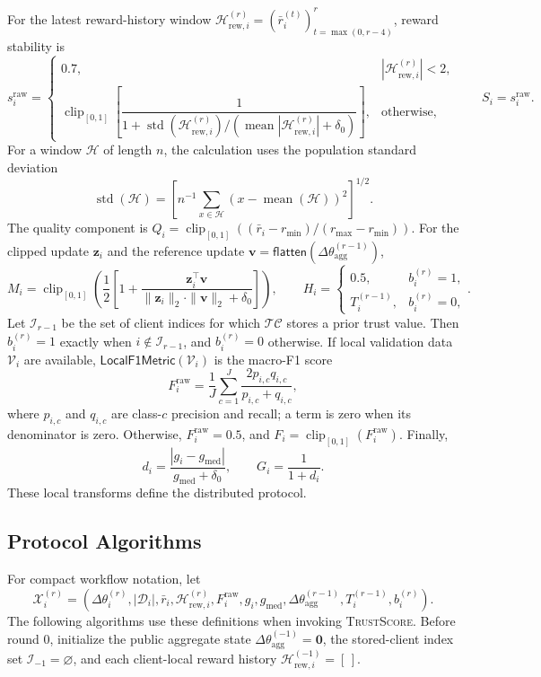 \documentclass{article}
\begin{document}
For the latest reward-history window
$\mathcal H_{\mathrm{rew},i}^{(r)}=
(\bar r_i^{(t)})_{t=\max(0,r-4)}^{r}$, reward stability is
\[
s_i^{\mathrm{raw}}=
\begin{cases}
0.7, & |\mathcal H_{\mathrm{rew},i}^{(r)}|<2,\\
\operatorname{clip}_{[0,1]}
\left[
\dfrac{1}{1+
\operatorname{std}(\mathcal H_{\mathrm{rew},i}^{(r)})/
(\operatorname{mean}|\mathcal H_{\mathrm{rew},i}^{(r)}|+\delta_0)}
\right], & \text{otherwise,}
\end{cases}
\qquad
S_i=s_i^{\mathrm{raw}}.
\]
For a window $\mathcal H$ of length $n$, the calculation uses the population
standard deviation
\[
\operatorname{std}(\mathcal H)=
\left[n^{-1}\sum_{x\in\mathcal H}
(x-\operatorname{mean}(\mathcal H))^2\right]^{1/2}.
\]
The quality component is
$Q_i=\operatorname{clip}_{[0,1]}((\bar r_i-r_{\min})/(r_{\max}-r_{\min}))$.
For the clipped update $\mathbf z_i$ and the reference update
$\mathbf v=\mathsf{flatten}(\Delta\theta_{\mathrm{agg}}^{(r-1)})$,
\[
M_i=\operatorname{clip}_{[0,1]}
\left(
\dfrac{1}{2}\left[
1+\dfrac{\mathbf z_i^\top\mathbf v}
{\|\mathbf z_i\|_2\cdot\|\mathbf v\|_2+\delta_0}
\right]
\right),
\qquad
H_i=
\begin{cases}
0.5, & b_i^{(r)}=1,\\
T_i^{(r-1)}, & b_i^{(r)}=0,
\end{cases}.
\]
Let $\mathcal I_{r-1}$ be the set of client indices for which $\mathcal{TC}$
stores a prior trust value. Then $b_i^{(r)}=1$ exactly when
$i\notin\mathcal I_{r-1}$, and $b_i^{(r)}=0$ otherwise.
If local validation data $\mathcal V_i$ are available,
$\mathsf{LocalF1Metric}(\mathcal V_i)$ is the macro-F1 score
\[
F_i^{\mathrm{raw}}=
\dfrac{1}{J}\sum_{c=1}^{J}
\dfrac{2p_{i,c}q_{i,c}}{p_{i,c}+q_{i,c}},
\]
where $p_{i,c}$ and $q_{i,c}$ are class-$c$ precision and recall; a term is
zero when its denominator is zero. Otherwise, $F_i^{\mathrm{raw}}=0.5$, and
$F_i=\operatorname{clip}_{[0,1]}(F_i^{\mathrm{raw}})$. Finally,
\[
d_i=\dfrac{|g_i-g_{\mathrm{med}}|}{g_{\mathrm{med}}+\delta_0},
\qquad
G_i=\dfrac{1}{1+d_i}.
\]
These local transforms define the distributed protocol.

\subsection{Protocol Algorithms}\label{sec:supp_protocol_algorithms}

For compact workflow notation, let
\[
\mathcal X_i^{(r)}=
\left(\Delta\theta_i^{(r)},|\mathcal D_i|,\bar r_i,
\mathcal H_{\mathrm{rew},i}^{(r)},F_i^{\mathrm{raw}},g_i,g_{\mathrm{med}},
\Delta\theta_{\mathrm{agg}}^{(r-1)},T_i^{(r-1)},b_i^{(r)}\right).
\]
The following algorithms use these definitions when invoking
\textsc{TrustScore}.
Before round $0$, initialize the public aggregate state
$\Delta\theta_{\mathrm{agg}}^{(-1)}=\mathbf0$, the stored-client index set
$\mathcal I_{-1}=\varnothing$, and each client-local reward history
$\mathcal H_{\mathrm{rew},i}^{(-1)}=[\,]$.
\end{document}
